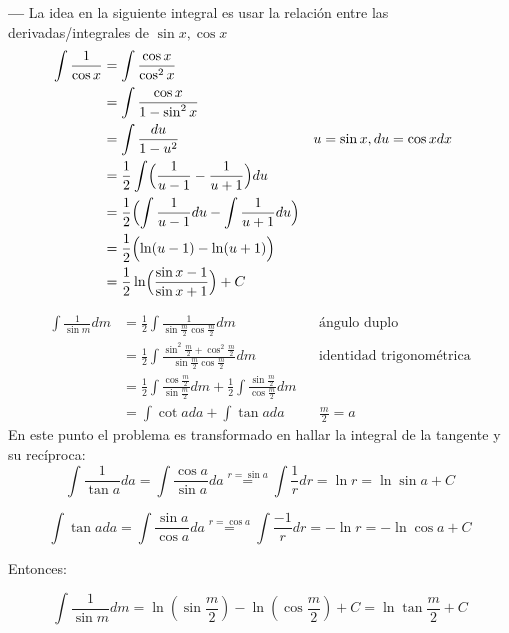 \documentclass[14pt]{extarticle}
\begin{document}
\textbf{---} La idea en la siguiente integral es usar la relación entre las derivadas/integrales de $\sin x, \cos x$
\begin{align}
      \int \frac{1}{\cos x}
       & = \int \frac{\cos x}{\cos^2 x}                                                                                   \\
       & = \int \frac{\cos x}{1-\sin^2 x}                                                                                 \\
       & = \int \frac{du}{1-u^2}                                                 &  & \text{$u = \sin x, du = \cos x dx$} \\
       & = \frac{1}{2} \int  \Bigl(  \frac{1}{u-1} - \frac{1}{u+1}   \Bigr)du                                             \\
       & = \frac{1}{2} \Bigl( \int \frac{1}{u-1}du - \int \frac{1}{u+1}du \Bigr)                                          \\
       & =  \frac{1}{2} \Bigl(  \ln (u-1) - \ln (u+1) \Bigr)                                                              \\
       & = \frac{1}{2}\ln \Bigl( \frac{\sin x -1}{\sin x +1} \Bigr) + C
\end{align}


\begin{align}
\int \frac{1}{\sin m} dm
& = \frac{1}{2} \int \frac{1}{\sin{\frac{m}{2}}\cos{\frac{m}{2}}}dm                                                                 &  & \text{ángulo duplo}             \\
& = \frac{1}{2} \int \frac{\sin^2{\frac{m}{2}} + \cos^2{\frac{m}{2}}}{\sin{\frac{m}{2}}\cos{\frac{m}{2}}}dm                         &  & \text{identidad trigonométrica} \\
& = \frac{1}{2} \int \frac{\cos{\frac{m}{2}}}{\sin{\frac{m}{2}}}dm + \frac{1}{2} \int \frac{\sin{\frac{m}{2}}}{\cos{\frac{m}{2}}}dm                                      \\
& = \int \cot{a} da + \int \tan{a}da                                                                                                &  & \text{$\frac{m}{2} = a$}
\end{align}
En este punto el problema es transformado en hallar la integral de la tangente y su recíproca:
$$\int \frac{1}{\tan a} da = \int \frac{\cos a}{\sin a} da \stackrel{r = \sin{a}}{=} \int \frac{1}{r}dr = \ln{r} = \ln{\sin a}+C$$

$$\int \tan a da = \int \frac{\sin a}{\cos a}da \stackrel{r = \cos{a}}{=} \int \frac{-1}{r}dr = -\ln{r} = -\ln{\cos a}+C$$

Entonces:

$$\int \frac{1}{\sin m} dm = \ln(\sin \frac{m}{2}) - \ln(\cos \frac{m}{2}) + C = \ln{\tan{\frac{m}{2}}}+C$$
\end{document}
